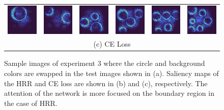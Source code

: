 \documentclass[letterpaper]{article} %
\begin{document}
\begin{figure}[!htbp]
\begin{tabular}{cccccc}
\multicolumn{1}{c}{\includegraphics[width=0.125\linewidth]{saliency/ce/circle/swap_1.png}} \hspace{-12pt} &  \multicolumn{1}{c}{\includegraphics[width=0.125\linewidth]{saliency/ce/circle/swap_2.png}} \hspace{-12pt} & \multicolumn{1}{c}{\includegraphics[width=0.125\linewidth]{saliency/ce/circle/swap_3.png}} \hspace{-12pt} & \multicolumn{1}{c}{\includegraphics[width=0.125\linewidth]{saliency/ce/circle/swap_4.png}} \hspace{-12pt} & \multicolumn{1}{c}{\includegraphics[width=0.125\linewidth]{saliency/ce/circle/swap_5.png}} \hspace{-12pt} & \multicolumn{1}{c}{\includegraphics[width=0.125\linewidth]{saliency/ce/circle/swap_6.png}} \\ 
\multicolumn{6}{c}{(c) CE Loss}
\end{tabular}
\caption{Sample images of experiment 3 where the circle and background colors are swapped in the test images shown in (a). Saliency maps of the HRR and CE loss are shown in (b) and (c), respectively. The attention of the network is more focused on the boundary region in the case of HRR.}
\label{fig:exp_3_saliency}
\end{figure}
\end{document}
